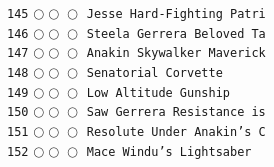 \documentclass[a4paper,landscape]{article}
\begin{document}
\begin{multicols*}{5}
\texttt{145} \(\bigcirc\!\bigcirc\!\bigcirc\)  \texttt{Jesse Hard-Fighting Patri} \vspace{-0.3mm}\\ 
\texttt{146} \(\bigcirc\!\bigcirc\!\bigcirc\)  \texttt{Steela Gerrera Beloved Ta} \vspace{-0.3mm}\\ 
\texttt{147} \(\bigcirc\!\bigcirc\!\bigcirc\)  \texttt{Anakin Skywalker Maverick} \vspace{-0.3mm}\\ 
\texttt{148} \(\bigcirc\!\bigcirc\!\bigcirc\)  \texttt{Senatorial Corvette} \vspace{-0.3mm}\\ 
\texttt{149} \(\bigcirc\!\bigcirc\!\bigcirc\)  \texttt{Low Altitude Gunship} \vspace{-0.3mm}\\ 
\texttt{150} \(\bigcirc\!\bigcirc\!\bigcirc\)  \texttt{Saw Gerrera Resistance is} \vspace{-0.3mm}\\ 
\texttt{151} \(\bigcirc\!\bigcirc\!\bigcirc\)  \texttt{Resolute Under Anakin's C} \vspace{-0.3mm}\\ 
\texttt{152} \(\bigcirc\!\bigcirc\!\bigcirc\)  \texttt{Mace Windu's Lightsaber} \vspace{-0.3mm}\\ 

\end{multicols*}
\end{document}
